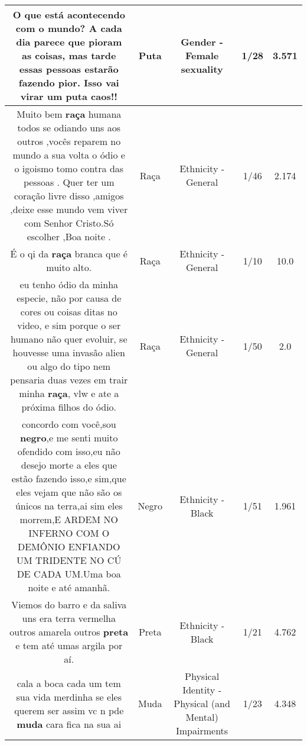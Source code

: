 \documentclass[11pt]{article}
\newlength\mylength
\begin{document}
\begin{center}
\begin{longtable}{|C{.65\mylength}|C{.30\mylength}|C{.12\mylength}|C{.12\mylength}|C{.12\mylength}|}
  \small O que está acontecendo com o mundo? A cada dia parece que pioram as coisas, mas tarde essas pessoas estarão fazendo pior. Isso vai virar um \textbf{puta} caos!!\normalsize   & Puta & Gender - Female sexuality & 1/28 & 3.571 \\  \hline
  \small Muito bem \textbf{raça} humana todos se odiando uns aos outros ,vocês  reparem  no mundo a sua volta o ódio e o igoismo tomo contra das pessoas . Quer ter um coração livre disso ,amigos ,deixe esse mundo vem viver com Senhor Cristo.Só escolher ,Boa noite .\normalsize   & Raça & Ethnicity - General & 1/46 & 2.174 \\  \hline
  \small É o qi da \textbf{raça} branca que é muito alto.\normalsize   & Raça & Ethnicity - General & 1/10 & 10.0 \\  \hline
  \small eu tenho ódio da minha especie, não por causa de cores ou coisas ditas no video, e sim porque o ser humano não quer evoluir, se houvesse uma invasão alien ou algo do tipo nem pensaria duas vezes em trair minha \textbf{raça}, vlw e ate a próxima filhos do ódio.\normalsize   & Raça & Ethnicity - General & 1/50 & 2.0 \\  \hline
  \small concordo com você,sou \textbf{negro},e me senti muito ofendido com isso,eu não desejo morte a eles que estão fazendo isso,e sim,que eles vejam que não são os únicos na terra,ai sim eles morrem,E ARDEM NO INFERNO COM O DEMÔNIO ENFIANDO UM TRIDENTE NO CÚ DE CADA UM.Uma boa noite e até amanhã.\normalsize   & Negro & Ethnicity - Black & 1/51 & 1.961 \\  \hline
  \small Viemos do barro e da saliva uns era terra vermelha outros amarela outros \textbf{preta} e tem até umas argila por aí.\normalsize   & Preta & Ethnicity - Black & 1/21 & 4.762 \\  \hline
  \small cala a boca cada um tem sua vida  merdinha se eles querem ser assim vc n pde \textbf{muda} cara fica na sua ai\normalsize   & Muda & Physical Identity - Physical (and Mental) Impairments & 1/23 & 4.348 \\  \hline

\end{longtable}
\end{center}
\end{document}
